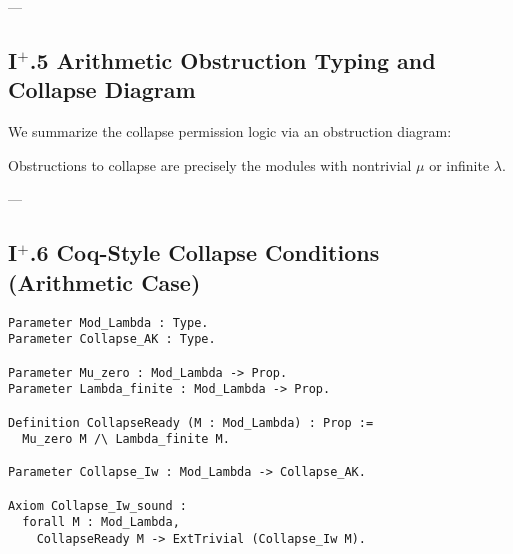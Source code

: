 \documentclass[11pt]{article}
\begin{document}
---

\subsection*{I$^{+}$.5 Arithmetic Obstruction Typing and Collapse Diagram}

We summarize the collapse permission logic via an obstruction diagram:

\begin{center}
\end{center}

Obstructions to collapse are precisely the modules with nontrivial $\mu$ or infinite $\lambda$.

---

\subsection*{I$^{+}$.6 Coq-Style Collapse Conditions (Arithmetic Case)}

\begin{lstlisting}[language=Coq]
Parameter Mod_Lambda : Type.
Parameter Collapse_AK : Type.

Parameter Mu_zero : Mod_Lambda -> Prop.
Parameter Lambda_finite : Mod_Lambda -> Prop.

Definition CollapseReady (M : Mod_Lambda) : Prop :=
  Mu_zero M /\ Lambda_finite M.

Parameter Collapse_Iw : Mod_Lambda -> Collapse_AK.

Axiom Collapse_Iw_sound :
  forall M : Mod_Lambda,
    CollapseReady M -> ExtTrivial (Collapse_Iw M).
\end{lstlisting}
\end{document}
